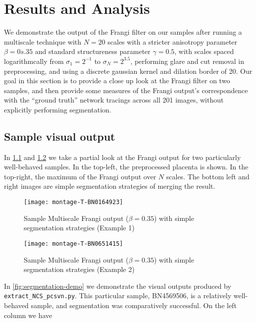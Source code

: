 \chapter{Results and Analysis} \label{ch:results-analysis}

We demonstrate the output of the Frangi filter on our samples after running a multiscale technique with $N=20$ scales with a stricter anisotropy parameter $\beta = 0s.35$ and standard structureness parameter $\gamma=0.5$,
with scales spaced logarithmcally from $\sigma_1 = 2^{-1}$ to $\sigma_N = 2^{3.5}$, performing glare and cut removal in preprocessing, and using a discrete gaussian kernel and dilation border of 20.
Our goal in this section is to provide a close up look at the Frangi filter on two samples, and then provide some measures of the Frangi output's correspondence with the ``ground truth'' network tracings across all 201 images, without explicitly performing segmentation.
\section{Sample visual output}
In \cref{fig:output-montage-example1} and \cref{fig:output-montage-example2} we take a partial look at the Frangi output for two particularly well-behaved samples. In the top-left, the preprocessed placenta is shown. In the top-right, the maximum of the Frangi output over $N$ scales. The bottom left and right images are simple segmentation strategies of merging the result.

\begin{figure} \centering
  \texttt{[image: montage-T-BN0164923]}
  \caption{Sample Multiscale Frangi output ($\beta=0.35$) with simple segmentation strategies (Example 1)}
  \label{fig:output-montage-example1}
\end{figure}

\begin{figure} \centering
  \texttt{[image: montage-T-BN0651415]}
  \caption{Sample Multiscale Frangi output ($\beta=0.35$) with simple segmentation strategies (Example 2)}
  \label{fig:output-montage-example2}
\end{figure}







In \cref{fig:segmentation-demo} we demonstrate the visual outputs produced by \texttt{extract\_NCS\_pcsvn.py}. This particular sample, BN4569506, is a relatively well-behaved sample, and segmentation was comparatively successful. On the left column we have 

